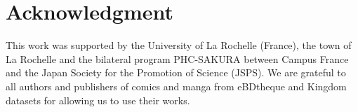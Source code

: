 \documentclass[conference]{IEEEtran}
\begin{document}
\section*{Acknowledgment}
\label{sec:acknowledgment}

This work was supported by the University of La Rochelle (France), the town of La Rochelle and the bilateral program PHC-SAKURA between Campus France and the Japan Society for the Promotion of Science (JSPS).
We are grateful to all authors and publishers of comics and manga from eBDtheque and Kingdom datasets for allowing us to use their works.





% 

% 

% 
  

%

%

\end{document}
